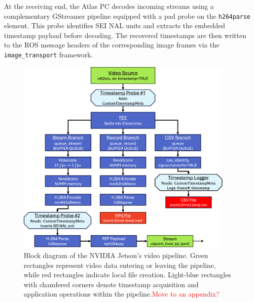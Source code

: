 \documentclass[../main.tex]{subfiles}
\begin{document}
At the receiving end, the Atlas PC decodes incoming streams using a complementary GStreamer pipeline equipped with a pad probe on the \texttt{h264parse} element. This probe identifies SEI NAL units and extracts the embedded timestamp payload before decoding. The recovered timestamps are then written to the ROS message headers of the corresponding image frames via the \texttt{image\_transport} framework.


\begin{figure}[htbp]
\centering
\includegraphics[width=0.95\textwidth]{Images/gstreamer_block.png}
\caption{Block diagram of the NVIDIA Jetson's video pipeline. Green rectangles represent video data entering or leaving the pipeline, while red rectangles indicate local file creation. Light-blue rectangles with chamfered corners denote timestamp acquisition and application operations within the pipeline.\textcolor{red}{Move to an appendix?}}
\label{video_pipeline}
\end{figure}
\end{document}
